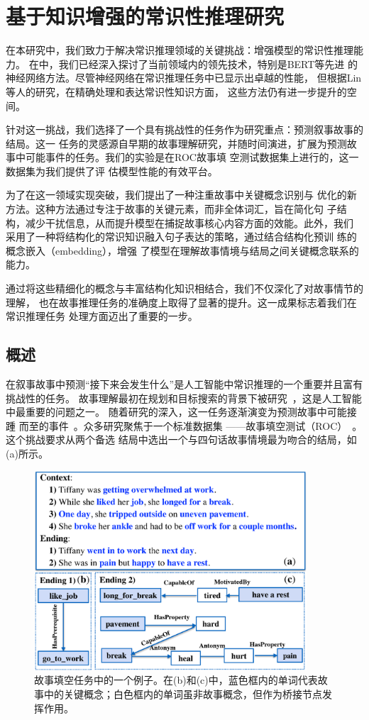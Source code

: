 \section{基于知识增强的常识性推理研究}
在本研究中，我们致力于解决常识推理领域的关键挑战：增强模型的常识性推理能力。
在中，我们已经深入探讨了当前领域内的领先技术，特别是BERT等先进
的神经网络方法。尽管神经网络在常识推理任务中已显示出卓越的性能，
但根据Lin等人的研究\cite{lin2020birds,peng2022copen}，在精确处理和表达常识性知识方面，
这些方法仍有进一步提升的空间。

针对这一挑战，我们选择了一个具有挑战性的任务作为研究重点：预测叙事故事的结局。这一
任务的灵感源自早期的故事理解研究\cite{meehan1977tale}，并随时间演进，扩展为预测故
事中可能事件的任务\cite{chambers2008unsupervised}。我们的实验是在ROC故事填
空测试数据集\cite{mostafazadeh2016corpus}上进行的，这一数据集为我们提供了评
估模型性能的有效平台。

为了在这一领域实现突破，我们提出了一种注重故事中关键概念识别与
优化的新方法。这种方法通过专注于故事的关键元素，而非全体词汇，旨在简化句
子结构，减少干扰信息，从而提升模型在捕捉故事核心内容方面的效能。此外，我们
采用了一种将结构化的常识知识融入句子表达的策略，通过结合结构化预训
练的概念嵌入（embedding），增强
了模型在理解故事情境与结局之间关键概念联系的能力。

通过将这些精细化的概念与丰富结构化知识相结合，我们不仅深化了对故事情节的理解，
也在故事推理任务的准确度上取得了显著的提升。这一成果标志着我们在常识推理任务
处理方面迈出了重要的一步。

\subsection{概述}
\label{sec2:intro}
在叙事故事中预测``接下来会发生什么''是人工智能中常识推理的一个重要并且富有挑战性的任务。
故事理解最初在规划和目标搜索的背景下被研究~\cite{meehan1977tale}，这是人工智能中最重要的问题之一。
随着研究的深入，这一任务逐渐演变为预测故事中可能接踵
而至的事件~\cite{chambers2008unsupervised}。众多研究聚焦于一个标准数据集
——故事填空测试（ROC）~\cite{mostafazadeh2016corpus}。这个挑战要求从两个备选
结局中选出一个与四句话故事情境最为吻合的结局，如(a)所示。

\begin{figure}[th]
  \centering\includegraphics[width=4in]{figures/story/story_example}
  \caption{故事填空任务中的一个例子。在(b)和(c)中，蓝色框内的单词代表故事中的关键概念；白色框内的单词虽非故事概念，但作为桥接节点发挥作用。}
  \label{fig:story}
  \end{figure}

